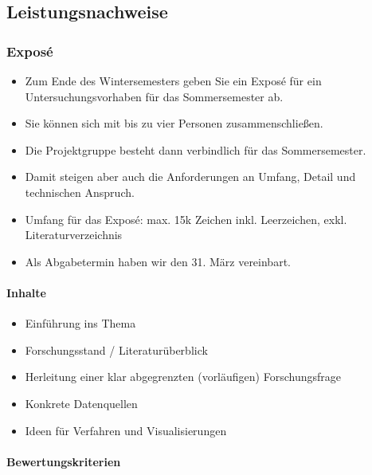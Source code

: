 \documentclass[11pt,german,a4paper]{article}
\providecommand{\tightlist}{%
  \setlength{\itemsep}{0pt}\setlength{\parskip}{0pt}}
\let\oldparagraph\paragraph
\renewcommand{\paragraph}[1]{\oldparagraph{#1}\mbox{}}
\begin{document}
\hypertarget{leistungsnachweise}{%
\subsection*{Leistungsnachweise}\label{leistungsnachweise}}

\hypertarget{exposuxe9}{%
\subsubsection{Exposé}\label{exposuxe9}}

\begin{itemize}
\tightlist
\item
  Zum Ende des Wintersemesters geben Sie ein Exposé für ein Untersuchungsvorhaben für das Sommersemester ab.
\item
  Sie können sich mit bis zu vier Personen zusammenschließen.
\item
  Die Projektgruppe besteht dann verbindlich für das Sommersemester.
\item
  Damit steigen aber auch die Anforderungen an Umfang, Detail und technischen Anspruch.
\item
  Umfang für das Exposé: max. 15k Zeichen inkl. Leerzeichen, exkl. Literaturverzeichnis
\item
  Als Abgabetermin haben wir den 31. März vereinbart.
\end{itemize}

\hypertarget{inhalte}{%
\paragraph{Inhalte}\label{inhalte}}

\begin{itemize}
\tightlist
\item
  Einführung ins Thema
\item
  Forschungsstand / Literaturüberblick
\item
  Herleitung einer klar abgegrenzten (vorläufigen) Forschungsfrage
\item
  Konkrete Datenquellen
\item
  Ideen für Verfahren und Visualisierungen
\end{itemize}

\hypertarget{bewertungskriterien}{%
\paragraph{Bewertungskriterien}\label{bewertungskriterien}}
\end{document}
